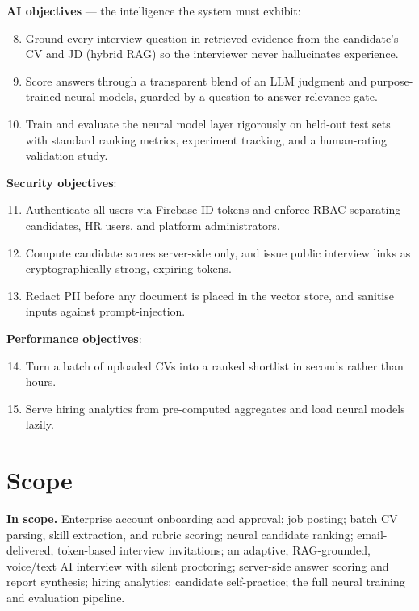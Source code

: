 \documentclass[12pt,a4paper,oneside]{report}
\begin{document}
\textbf{AI objectives} --- the intelligence the system must exhibit:

\begin{enumerate}
  \setcounter{enumi}{7}
  \item Ground every interview question in retrieved evidence from the candidate's CV and JD
    (hybrid RAG) so the interviewer never hallucinates experience.
  \item Score answers through a transparent blend of an LLM judgment and purpose-trained
    neural models, guarded by a question-to-answer relevance gate.
  \item Train and evaluate the neural model layer rigorously on held-out test sets with
    standard ranking metrics, experiment tracking, and a human-rating validation study.
\end{enumerate}

\textbf{Security objectives}:

\begin{enumerate}
  \setcounter{enumi}{10}
  \item Authenticate all users via Firebase ID tokens and enforce RBAC separating candidates,
    HR users, and platform administrators.
  \item Compute candidate scores server-side only, and issue public interview links as
    cryptographically strong, expiring tokens.
  \item Redact PII before any document is placed in the vector store, and sanitise inputs
    against prompt-injection.
\end{enumerate}

\textbf{Performance objectives}:

\begin{enumerate}
  \setcounter{enumi}{13}
  \item Turn a batch of uploaded CVs into a ranked shortlist in seconds rather than hours.
  \item Serve hiring analytics from pre-computed aggregates and load neural models lazily.
\end{enumerate}

\section{Scope}

\textbf{In scope.} Enterprise account onboarding and approval; job posting; batch CV parsing,
skill extraction, and rubric scoring; neural candidate ranking; email-delivered, token-based
interview invitations; an adaptive, RAG-grounded, voice/text AI interview with silent
proctoring; server-side answer scoring and report synthesis; hiring analytics; candidate
self-practice; the full neural training and evaluation pipeline.
\end{document}
